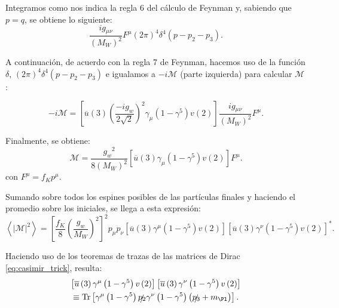 Integramos como nos indica la regla 6 del cálculo de Feynman y, sabiendo que $p=q$, se obtiene lo siguiente:
\begin{equation}
[\overline{u}\left( 3\right) \left( \dfrac{-ig_w}{2\sqrt{2}}\right) ^{2}\gamma _{\mu }\left( 1-\gamma ^{5}\right) v\left( 2\right)] \dfrac{ig{_{\mu \nu}}}{\left( M_W\right)^{2}}F^{\mu}\left( 2\pi \right) ^{4}\delta ^{4}\left(p-p_{2}-p_{3}\right) .
\end{equation}

A continuación, de acuerdo con la regla 7 de Feynman, hacemos uso de la función $\delta$, $\left( 2\pi \right) ^{4}\delta ^{4}\left(p-p_{2}-p_{3}\right)$ e igualamos a $-i\mathcal{M}$ (parte izquierda) para calcular $\mathcal{M}$:

\begin{equation}
-i\mathcal{M}=[\overline{u}\left( 3\right) \left( \dfrac{-ig_w}{2\sqrt{2}}\right) ^{2}\gamma _{\mu }\left( 1-\gamma ^{5}\right) v\left( 2\right)] \dfrac{ig{_{\mu \nu}}}{\left( M_W\right)^{2}}F^{\mu} .
\end{equation}

Finalmente, se obtiene:
\begin{equation}
\mathcal{M} =\dfrac{{g_{w}}^2}{8\left( M_W\right)^{2}}\left[ \overline{u}\left(3\right) \gamma_{\mu}\left( 1-\gamma ^{5} \right) v\left( 2\right) \right] F^{\mu} .
\end{equation}
con $F^{\mu}=f_K p^{\mu}$.

Sumando sobre todos los espines posibles de las partículas finales y haciendo el promedio sobre los iniciales, se llega a esta expresión:
\begin{equation}
\left\langle |\mathcal{M}|^{2}\right\rangle=\left[ \dfrac{f_{K}}{8}\left( \dfrac{g_w}{M_W}\right)^{2}\right]^{2} p_{\mu }p_{\nu} \left[ \overline{u}\left( 3\right)\gamma^{\mu}\left( 1-\gamma^{5}\right) v\left( 2\right) \right] \left[ \overline{u}\left( 3\right) \gamma^{\nu} \left( 1-\gamma^{5}\right) v\left( 2\right) \right] ^{\ast } .
\end{equation}

Haciendo uso de los teoremas de trazas de las matrices de Dirac \ref{eq:casimir_trick}, resulta:
\begin{multline}
\left[ \overline{u}\left( 3\right)\gamma^{\mu}\left( 1-\gamma^{5}\right) v\left( 2\right) \right] \left[ \overline{u}\left( 3\right) \gamma^{\nu }\left( 1-\gamma^{5}\right) v\left( 2\right) \right] \\ \equiv \Tr \left[ \gamma^{\mu } \left(1 -\gamma ^{5}\right) \slashed{p_{2}}\gamma^{\nu }\left( 1-\gamma ^{5}\right) \left( \slashed{p_{3}}+m_{\Pl}\right) \right] .
\end{multline}

